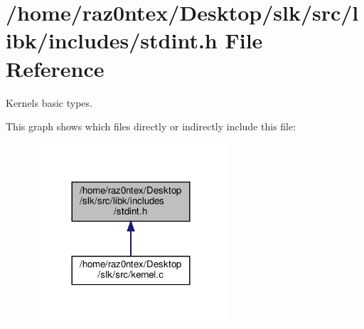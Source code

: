 \section{/home/raz0ntex/\+Desktop/slk/src/libk/includes/stdint.h File Reference}
\label{stdint_8h}


Kernel\textquotesingle{}s basic types.  


This graph shows which files directly or indirectly include this file\+:
\nopagebreak
\begin{figure}[H]
\begin{center}
\leavevmode
\includegraphics[width=204pt]{stdint_8h__dep__incl}
\end{center}
\end{figure}
